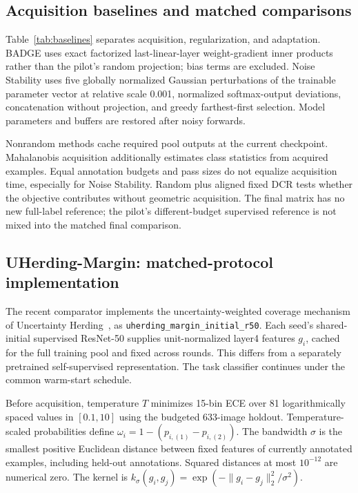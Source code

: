 \documentclass[10pt,a4paper,twocolumn]{article}
\begin{document}
\subsection{Acquisition baselines and matched comparisons}

Table~\ref{tab:baselines} separates acquisition, regularization,
and adaptation.
BADGE uses exact factorized last-linear-layer weight-gradient
inner products rather than the pilot's random projection;
bias terms are excluded.
Noise Stability uses five globally normalized Gaussian
perturbations of the trainable parameter vector at relative
scale 0.001, normalized softmax-output deviations, concatenation
without projection, and greedy farthest-first selection.
Model parameters and buffers are restored after noisy forwards.

Nonrandom methods cache required pool outputs at the current
checkpoint. Mahalanobis acquisition additionally estimates class
statistics from acquired examples.
Equal annotation budgets and pass sizes do not equalize
acquisition time, especially for Noise Stability.
Random plus aligned fixed DCR tests whether the objective
contributes without geometric acquisition.
The final matrix has no new full-label reference; the pilot's
different-budget supervised reference is not mixed into the
matched final comparison.

\subsection{UHerding-Margin: matched-protocol implementation}
\label{sec:uherding_setup}

The recent comparator implements the uncertainty-weighted coverage
mechanism of Uncertainty Herding~\cite{bae2025uncertainty},
as \texttt{uherding\_margin\_initial\_r50}.
Each seed's shared-initial supervised ResNet-50 supplies
unit-normalized layer4 features $g_i$, cached for the full
training pool and fixed across rounds.
This differs from a separately pretrained self-supervised
representation. The task classifier continues under the
common warm-start schedule.

Before acquisition, temperature $T$ minimizes 15-bin ECE over
81 logarithmically spaced values in $[0.1,10]$ using the
budgeted 633-image holdout.
Temperature-scaled probabilities define
$\omega_i=1-(p_{i,(1)}-p_{i,(2)})$.
The bandwidth $\sigma$ is the smallest positive Euclidean
distance between fixed features of currently annotated examples,
including held-out annotations. Squared distances at most
$10^{-12}$ are numerical zero.
The kernel is
$k_\sigma(g_i,g_j)=\exp(-\|g_i-g_j\|_2^2/\sigma^2)$.
\end{document}
